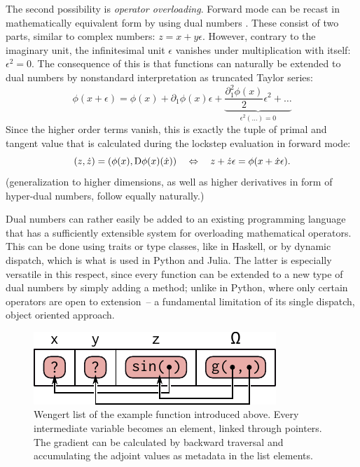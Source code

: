 The second possibility is \emph{operator overloading}.  Forward mode can be recast in mathematically
equivalent form by using dual numbers \parencite[see][section 3.1.1]{baydin2018automatic}.  These
consist of two parts, similar to complex numbers: \(z = x + y\epsilon\).  However, contrary to the
imaginary unit, the infinitesimal unit \(\epsilon\) vanishes under multiplication with itself:
\(\epsilon^2 = 0\).  The consequence of this is that functions can naturally be extended to dual
numbers by nonstandard interpretation as truncated Taylor series:
\begin{equation}
  \phi(x + \epsilon) = \phi(x) + \partial_1\phi(x)\epsilon + \underbrace{\frac{\partial^2_1\phi(x)}{2}\epsilon^2
  + \ldots}_{\epsilon^2 (\ldots) = 0}
\end{equation}
Since the higher order terms vanish, this is exactly the tuple of primal and tangent value that is
calculated during the lockstep evaluation in forward mode:
\begin{equation}
  (z, \dot{z}) = (\phi(x), \mathop{}\!\mathrm{D}\phi(x)(\dot{x})) \quad\Leftrightarrow\quad z + \dot{z}\epsilon = \phi(x + \dot{x}\epsilon).
\end{equation}
(generalization to higher dimensions, as well as higher derivatives in form of hyper-dual numbers,
follow equally naturally.)

Dual numbers can rather easily be added to an existing programming language that has a sufficiently
extensible system for overloading mathematical operators.  This can be done using traits or type
classes, like in Haskell, or by dynamic dispatch, which is what is used in Python and Julia.  The
latter is especially versatile in this respect, since every function can be extended to a new type
of dual numbers by simply adding a method; unlike in Python, where only certain operators are open
to extension~-- a fundamental limitation of its single dispatch, object oriented approach.

\begin{figure}[t]
  \centering
  \includegraphics{figures/wengert-list}
  \caption{Wengert list of the example function \protect{} introduced above.
    Every intermediate variable becomes an element, linked through pointers.  The gradient can be
    calculated by backward traversal and accumulating the adjoint values as metadata in the list
    elements.}
  \label{fig:wengert-list}
\end{figure}


